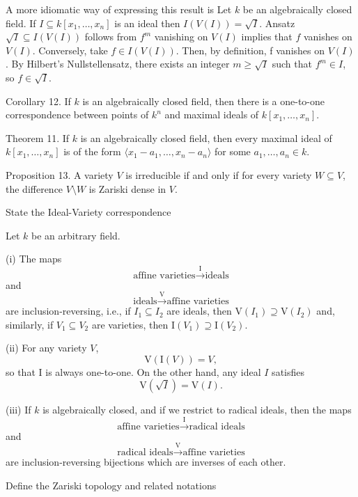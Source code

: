 A more idiomatic way of expressing this result is
Let \( k \) be an algebraically closed field. If \( I \subseteq k[x_1, \dots, x_n] \) is an ideal then 
\( I(V(I)) = \sqrt{I} \).
Ansatz
\( \sqrt{I} \subseteq I(V(I)) \) follows from \( f^m \) vanishing on \( V(I) \) implies that \( f \) vanishes on \( V(I) \).
Conversely, take \( f \in I(V(I)) \). Then, by definition, f vanishes on \( V(I) \). By Hilbert’s Nullstellensatz,
there exists an integer \( m \geq \sqrt{I} \) such that \( f^m \in I \), so \( f \in \sqrt{I} \).

Corollary 12. If \( k \) is an algebraically closed field, then there is a one-to-one correspondence 
between points of \( k^n \) and maximal ideals of \( k[x_1, \dots, x_n] \).

Theorem 11. If \( k \) is an algebraically closed field, then every maximal ideal of
\( k[x_1, \dots, x_n] \) is of the form \( \langle x_1 - a_1, \dots, x_n - a_n \rangle \) for some \( a_1, \dots, a_n \in k \).

Proposition 13. A variety \( V \) is irreducible if and only if for every variety \( W \subseteq V \),
the difference \( V \setminus W \) is Zariski dense in \( V \).


State the Ideal-Variety correspondence


Let \( k \) be an arbitrary field.

(i) The maps
\[
\text{affine varieties} \xrightarrow{\mathrm{I}} \text{ideals}
\]
and
\[
\text{ideals} \xrightarrow{\mathrm{V}} \text{affine varieties}
\]
are inclusion-reversing, i.e., if \( I_1 \subseteq I_2 \) are ideals, then \( \mathrm{V}(I_1) \supseteq \mathrm{V}(I_2) \) and, similarly, if \( V_1 \subseteq V_2 \) are varieties, then \( \mathrm{I}(V_1) \supseteq \mathrm{I}(V_2) \).

(ii) For any variety \( V \),
\[
\mathrm{V}(\mathrm{I}(V)) = V,
\]
so that \( \mathrm{I} \) is always one-to-one. On the other hand, any ideal \( I \) satisfies
\[
\mathrm{V}(\sqrt{I}) = \mathrm{V}(I).
\]

(iii) If \( k \) is algebraically closed, and if we restrict to radical ideals, then the maps
\[
\text{affine varieties} \xrightarrow{\mathrm{I}} \text{radical ideals}
\]
and
\[
\text{radical ideals} \xrightarrow{\mathrm{V}} \text{affine varieties}
\]
are inclusion-reversing bijections which are inverses of each other.




Define the Zariski topology and related notations

